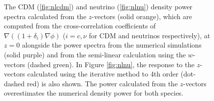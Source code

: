 \documentclass[twocolumn,superscriptaddress,prd]{revtex4}
\begin{document}

\begin{figure}[h!]
  \centering
  \caption{The CDM (\ref{fig:nlcdm}) and neutrino
    (\ref{fig:nlnu}) density power spectra calculated from the
    $z$-vectors (solid orange), which are
    computed from the cross-correlation coefficients of $\nabla
    ((1+\delta_i) \nabla \phi)$ ($i=c,\nu$ for CDM and neutrinos
    respectively), at $z=0$ alongside the power spectra from the 
    numerical simulations 
    (solid purple) and from the semi-linear calculation using 
    the $w$-vectors (dashed
    green).  In
    Figure \ref{fig:nlnu}, the response to the $z$-vectors
    calculated using the iterative method to 4th order (dot-dashed red) is
    also shown. The power calculated from the $z$-vectors
    overestimates the numerical density power for both
    species. 
}\label{fig:nl}
\end{figure}
\end{document}
